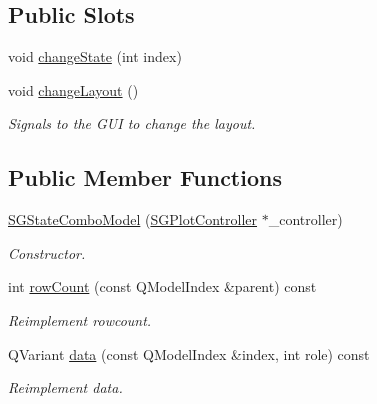 \subsection*{Public Slots}
\begin{DoxyCompactItemize}
\item 
void \hyperlink{classSGStateComboModel_a8e6030912a1495371e598466d9ac18a1}{change\+State} (int index)
\item 
\mbox{\label{classSGStateComboModel_a1f09e337ba9e9350748d9119c952a4a7}} 
void \hyperlink{classSGStateComboModel_a1f09e337ba9e9350748d9119c952a4a7}{change\+Layout} ()
\begin{DoxyCompactList}\small\item\em Signals to the G\+UI to change the layout. \end{DoxyCompactList}\end{DoxyCompactItemize}
\subsection*{Public Member Functions}
\begin{DoxyCompactItemize}
\item 
\mbox{\label{classSGStateComboModel_aa508cc12c3acce5929dcf0e456c8add0}} 
\hyperlink{classSGStateComboModel_aa508cc12c3acce5929dcf0e456c8add0}{S\+G\+State\+Combo\+Model} (\hyperlink{classSGPlotController}{S\+G\+Plot\+Controller} $\ast$\+\_\+controller)
\begin{DoxyCompactList}\small\item\em Constructor. \end{DoxyCompactList}\item 
\mbox{\label{classSGStateComboModel_a0a72e56d1782197ecc12bdc99cd90d7f}} 
int \hyperlink{classSGStateComboModel_a0a72e56d1782197ecc12bdc99cd90d7f}{row\+Count} (const Q\+Model\+Index \&parent) const
\begin{DoxyCompactList}\small\item\em Reimplement rowcount. \end{DoxyCompactList}\item 
\mbox{\label{classSGStateComboModel_a3b1b569bfcae454c46dc81fb14cb9339}} 
Q\+Variant \hyperlink{classSGStateComboModel_a3b1b569bfcae454c46dc81fb14cb9339}{data} (const Q\+Model\+Index \&index, int role) const
\begin{DoxyCompactList}\small\item\em Reimplement data. \end{DoxyCompactList}\end{DoxyCompactItemize}

